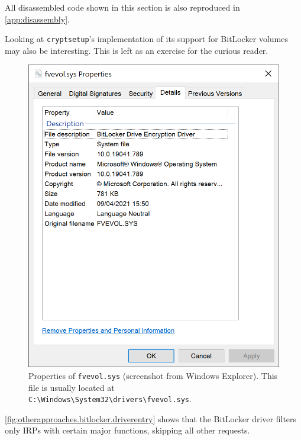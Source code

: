 All disassembled code shown in this section is also reproduced in \autoref{app:disassembly}.

Looking at \texttt{cryptsetup}'s implementation of its support for BitLocker volumes may also be interesting. This is left as an exercise for the curious reader.

\begin{figure}[htb!]
	\center
	\includegraphics[scale=0.7]{../img/otherapproaches.bitlocker.fvevol.png}
	\caption[
		Properties of \texttt{fvevol.sys}
	]{
		Properties of \texttt{fvevol.sys} (screenshot from Windows Explorer). This file is usually located at \texttt{C:\textbackslash Windows\textbackslash System32\textbackslash drivers\textbackslash fvevol.sys}.
	}
	\label{fig:otherapproaches.bitlocker.fvevol}
\end{figure}

\autoref{fig:otherapproaches.bitlocker.driverentry} shows that the BitLocker driver filters only IRPs with certain major functions, skipping all other requests.

